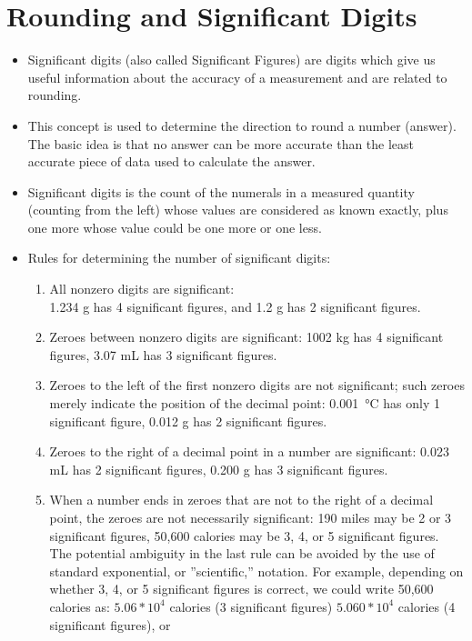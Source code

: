 \section{Rounding and Significant Digits}

\begin{itemize}
\item Significant digits (also called Significant Figures) are digits which give us useful information about the accuracy of a measurement and are related to rounding.
\item This concept is used to determine the direction to round a number (answer). The basic idea is that no answer can be more accurate than the least accurate piece of data used to calculate the answer.\\
\item Significant digits is the count of the numerals in a measured quantity (counting from the left) whose values are considered as known exactly, plus one more whose value could be one more or one less.\\
\item Rules for determining the number of significant digits:
\begin{enumerate}
\item All nonzero digits are significant:\\
1.234 g has 4 significant figures, and 1.2 g has 2 significant figures.
\item Zeroes between nonzero digits are significant:
1002 kg has 4 significant figures, 3.07 mL has 3 significant figures.
\item Zeroes to the left of the first nonzero digits are not significant; such zeroes merely indicate the position of the decimal point:
\SI{0.001}{\celsius} has only 1 significant figure, 0.012 g has 2 significant figures.
\item Zeroes to the right of a decimal point in a number are significant:
0.023 mL has 2 significant figures, 0.200 g has 3 significant figures.
\item When a number ends in zeroes that are not to the right of a decimal point, the zeroes are not necessarily significant:
190 miles may be 2 or 3 significant figures, 50,600 calories may be 3, 4, or 5 significant figures. The potential ambiguity in the last rule can be avoided by the use of standard exponential, or ”scientific,” notation. For example, depending on whether 3, 4, or 5 significant figures is correct, we could write 50,600 calories as: $5.06*10^4$ calories (3 significant figures) $5.060*10^4$ calories (4 significant figures), or

\end{enumerate}
\end{itemize}
